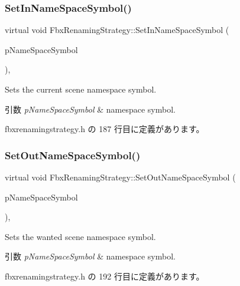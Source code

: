 \subsubsection{\texorpdfstring{Set\+In\+Name\+Space\+Symbol()}{SetInNameSpaceSymbol()}}
{\footnotesize\ttfamily virtual void Fbx\+Renaming\+Strategy\+::\+Set\+In\+Name\+Space\+Symbol (\begin{DoxyParamCaption}\item[{\hyperlink{class_fbx_string}{Fbx\+String}}]{p\+Name\+Space\+Symbol }\end{DoxyParamCaption})\hspace{0.3cm}{\ttfamily [inline]}, {\ttfamily [virtual]}}

Sets the current scene namespace symbol. 
\begin{DoxyParams}{引数}
{\em p\+Name\+Space\+Symbol} & namespace symbol. \\
\hline
\end{DoxyParams}


 fbxrenamingstrategy.\+h の 187 行目に定義があります。

\mbox{\label{class_fbx_renaming_strategy_a83507388cab84a8905861a8331d57092}} 
\subsubsection{\texorpdfstring{Set\+Out\+Name\+Space\+Symbol()}{SetOutNameSpaceSymbol()}}
{\footnotesize\ttfamily virtual void Fbx\+Renaming\+Strategy\+::\+Set\+Out\+Name\+Space\+Symbol (\begin{DoxyParamCaption}\item[{\hyperlink{class_fbx_string}{Fbx\+String}}]{p\+Name\+Space\+Symbol }\end{DoxyParamCaption})\hspace{0.3cm}{\ttfamily [inline]}, {\ttfamily [virtual]}}

Sets the wanted scene namespace symbol. 
\begin{DoxyParams}{引数}
{\em p\+Name\+Space\+Symbol} & namespace symbol. \\
\hline
\end{DoxyParams}


 fbxrenamingstrategy.\+h の 192 行目に定義があります。

